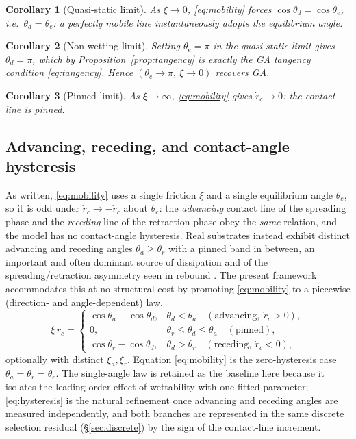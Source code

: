 \documentclass{jfm}
\newcommand{\be}{\begin{equation}}
\newcommand{\ee}{\end{equation}}
\newtheorem{corollary}{Corollary}
\begin{document}
\begin{corollary}[Quasi-static limit]\label{cor:quasistatic}
As $\xi\to0$, \eqref{eq:mobility} forces $\cos\theta_d=\cos\theta_e$, i.e.\
$\theta_d=\theta_e$: a perfectly mobile line instantaneously adopts the equilibrium
angle.
\end{corollary}
\begin{corollary}[Non-wetting limit]\label{cor:nonwetting}
Setting $\theta_e=\pi$ in the quasi-static limit gives $\theta_d=\pi$, which by
Proposition~\ref{prop:tangency} is exactly the GA tangency condition
\eqref{eq:tangency}. Hence $(\theta_e\to\pi,\ \xi\to0)$ recovers GA.
\end{corollary}
\begin{corollary}[Pinned limit]\label{cor:pinned}
As $\xi\to\infty$, \eqref{eq:mobility} gives $\dot r_c\to0$: the contact line is pinned.
\end{corollary}

\subsection{Advancing, receding, and contact-angle hysteresis}\label{sec:hysteresis}

As written, \eqref{eq:mobility} uses a single friction $\xi$ and a single equilibrium
angle $\theta_e$, so it is odd under $\dot r_c\to-\dot r_c$ about $\theta_e$: the
\emph{advancing} contact line of the spreading phase and the \emph{receding} line of the
retraction phase obey the \emph{same} relation, and the model has no contact-angle
hysteresis. Real substrates instead exhibit distinct advancing and receding angles
$\theta_a\ge\theta_r$ with a pinned band in between, an important and often dominant
source of dissipation and of the spreading/retraction asymmetry seen in rebound
\citep{JoannyDeGennes1984,SnoeijerAndreotti2013}. The present framework accommodates
this at no structural cost by promoting \eqref{eq:mobility} to a piecewise (direction- and
angle-dependent) law,
\be\label{eq:hysteresis}
\xi\,\dot r_c=
\begin{cases}
\cos\theta_a-\cos\theta_d, & \theta_d<\theta_a \quad(\text{advancing},\ \dot r_c>0),\\[2pt]
0, & \theta_r\le\theta_d\le\theta_a \quad(\text{pinned}),\\[2pt]
\cos\theta_r-\cos\theta_d, & \theta_d>\theta_r \quad(\text{receding},\ \dot r_c<0),
\end{cases}
\ee
optionally with distinct $\xi_a,\xi_r$. Equation \eqref{eq:mobility} is the
zero-hysteresis case $\theta_a=\theta_r=\theta_e$. The single-angle law is retained as the
baseline here because it isolates the leading-order effect of wettability with one fitted
parameter; \eqref{eq:hysteresis} is the natural refinement once advancing and receding
angles are measured independently, and both branches are represented in the same discrete
selection residual (\S\ref{sec:discrete}) by the sign of the contact-line increment.
\end{document}
